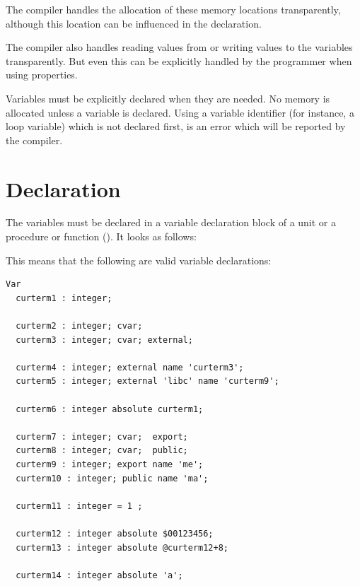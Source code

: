 The \fpc compiler handles the allocation of these memory locations
transparently, although this location can be influenced in the declaration.

The \fpc compiler also handles reading values from or writing values to
the variables transparently. But even this can be explicitly handled by the
programmer when using properties.

Variables must be explicitly declared when they are needed. No memory is
allocated unless a variable is declared. Using a variable identifier (for
instance, a loop variable) which is not declared first, is an error which
will be reported by the compiler.

\section{Declaration}
The variables must be declared in a variable declaration block of a unit
or a procedure or function (). It looks as follows:


 
This means that the following are valid variable declarations:
 
\begin{verbatim}
Var
  curterm1 : integer;

  curterm2 : integer; cvar;
  curterm3 : integer; cvar; external;

  curterm4 : integer; external name 'curterm3';
  curterm5 : integer; external 'libc' name 'curterm9';

  curterm6 : integer absolute curterm1;
 
  curterm7 : integer; cvar;  export;
  curterm8 : integer; cvar;  public;
  curterm9 : integer; export name 'me';
  curterm10 : integer; public name 'ma';

  curterm11 : integer = 1 ;

  curterm12 : integer absolute $00123456;
  curterm13 : integer absolute @curterm12+8;

  curterm14 : integer absolute 'a';
\end{verbatim}

